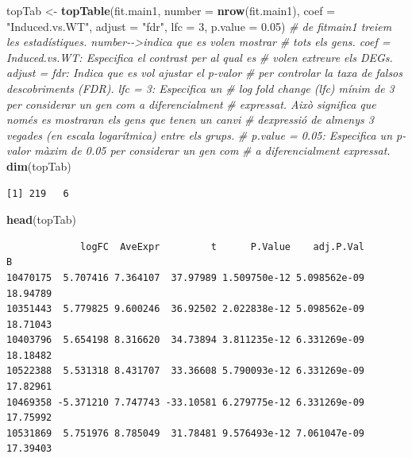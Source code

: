 \documentclass[
]{article}
\newenvironment{Shaded}{\begin{snugshade}}{\end{snugshade}}
\newcommand{\AttributeTok}[1]{\textcolor[rgb]{0.13,0.29,0.53}{#1}}
\newcommand{\CommentTok}[1]{\textcolor[rgb]{0.56,0.35,0.01}{\textit{#1}}}
\newcommand{\DecValTok}[1]{\textcolor[rgb]{0.00,0.00,0.81}{#1}}
\newcommand{\FloatTok}[1]{\textcolor[rgb]{0.00,0.00,0.81}{#1}}
\newcommand{\FunctionTok}[1]{\textcolor[rgb]{0.13,0.29,0.53}{\textbf{#1}}}
\newcommand{\NormalTok}[1]{#1}
\newcommand{\OtherTok}[1]{\textcolor[rgb]{0.56,0.35,0.01}{#1}}
\newcommand{\StringTok}[1]{\textcolor[rgb]{0.31,0.60,0.02}{#1}}
\begin{document}
\begin{Shaded}
\begin{Highlighting}[]
\NormalTok{topTab }\OtherTok{\textless{}{-}} \FunctionTok{topTable}\NormalTok{(fit.main1, }\AttributeTok{number =} \FunctionTok{nrow}\NormalTok{(fit.main1), }\AttributeTok{coef =} \StringTok{"Induced.vs.WT"}\NormalTok{, }\AttributeTok{adjust =} \StringTok{"fdr"}\NormalTok{,}
    \AttributeTok{lfc =} \DecValTok{3}\NormalTok{, }\AttributeTok{p.value =} \FloatTok{0.05}\NormalTok{)}
\CommentTok{\# de fitmain1 treiem les estadístiques. number{-}{-}\textgreater{}indica que es volen mostrar}
\CommentTok{\# tots els gens. coef = \textquotesingle{}Induced.vs.WT\textquotesingle{}: Especifica el contrast per al qual es}
\CommentTok{\# volen extreure els DEGs. adjust = \textquotesingle{}fdr\textquotesingle{}: Indica que es vol ajustar el p{-}valor}
\CommentTok{\# per controlar la taxa de falsos descobriments (FDR). lfc = 3: Especifica un}
\CommentTok{\# log fold change (lfc) mínim de 3 per considerar un gen com a diferencialment}
\CommentTok{\# expressat. Això significa que només es mostraran els gens que tenen un canvi}
\CommentTok{\# d\textquotesingle{}expressió de almenys 3 vegades (en escala logarítmica) entre els grups.}
\CommentTok{\# p.value = 0.05: Especifica un p{-}valor màxim de 0.05 per considerar un gen com}
\CommentTok{\# a diferencialment expressat.}
\FunctionTok{dim}\NormalTok{(topTab)}
\end{Highlighting}
\end{Shaded}

\begin{verbatim}
[1] 219   6
\end{verbatim}

\begin{Shaded}
\begin{Highlighting}[]
\FunctionTok{head}\NormalTok{(topTab)}
\end{Highlighting}
\end{Shaded}

\begin{verbatim}
             logFC  AveExpr         t      P.Value    adj.P.Val        B
10470175  5.707416 7.364107  37.97989 1.509750e-12 5.098562e-09 18.94789
10351443  5.779825 9.600246  36.92502 2.022838e-12 5.098562e-09 18.71043
10403796  5.654198 8.316620  34.73894 3.811235e-12 6.331269e-09 18.18482
10522388  5.531318 8.431707  33.36608 5.790093e-12 6.331269e-09 17.82961
10469358 -5.371210 7.747743 -33.10581 6.279775e-12 6.331269e-09 17.75992
10531869  5.751976 8.785049  31.78481 9.576493e-12 7.061047e-09 17.39403
\end{verbatim}
\end{document}
